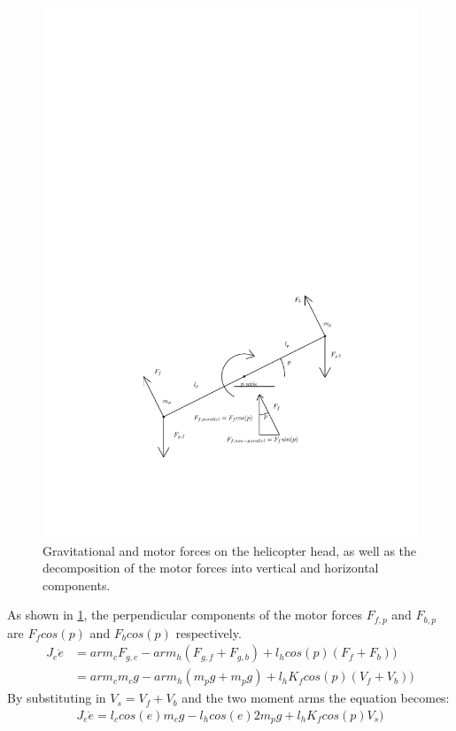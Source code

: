 \begin{figure}[H]
  \caption{Gravitational and motor forces on the helicopter head, as
    well as the decomposition of the motor forces into vertical and
    horizontal components.}
  \label{fig:pitch_model}
  \includegraphics[width=1\textwidth]{images/pitch_model}
\end{figure}
%
As shown in \cref{fig:pitch_model}, the perpendicular components of the
motor forces $F_{f,p}$ and $F_{b,p}$ are $F_fcos(p)$ and $F_bcos(p)$
respectively.
%
\begin{align*}
  J_e\ddot{e} &= arm_cF_{g,c} - arm_h(F_{g,f}+F_{g,b}) + l_hcos(p)(F_f + F_b)) \\
              &= arm_cm_cg - arm_h(m_pg + m_pg) + l_hK_fcos(p)(V_f + V_b))
\end{align*}
%
By substituting in $V_s = V_f + V_b$ and the two moment arms the
equation becomes: %
\begin{align*}
  J_e\ddot{e} = l_ccos(e)m_cg - l_hcos(e)2m_pg + l_hK_fcos(p)V_s)
\end{align*}
